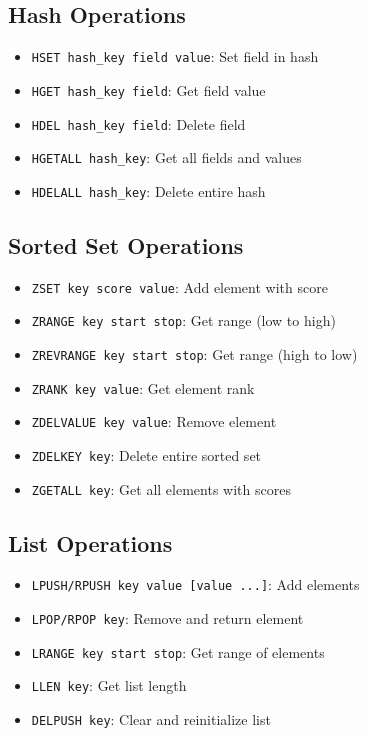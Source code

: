 \documentclass[11pt]{article}
\begin{document}
\subsection{Hash Operations}
\begin{itemize}
    \item \texttt{HSET hash\_key field value}: Set field in hash
    \item \texttt{HGET hash\_key field}: Get field value
    \item \texttt{HDEL hash\_key field}: Delete field
    \item \texttt{HGETALL hash\_key}: Get all fields and values
    \item \texttt{HDELALL hash\_key}: Delete entire hash
\end{itemize}

\subsection{Sorted Set Operations}
\begin{itemize}
    \item \texttt{ZSET key score value}: Add element with score
    \item \texttt{ZRANGE key start stop}: Get range (low to high)
    \item \texttt{ZREVRANGE key start stop}: Get range (high to low)
    \item \texttt{ZRANK key value}: Get element rank
    \item \texttt{ZDELVALUE key value}: Remove element
    \item \texttt{ZDELKEY key}: Delete entire sorted set
    \item \texttt{ZGETALL key}: Get all elements with scores
\end{itemize}

\subsection{List Operations}
\begin{itemize}
    \item \texttt{LPUSH/RPUSH key value [value ...]}: Add elements
    \item \texttt{LPOP/RPOP key}: Remove and return element
    \item \texttt{LRANGE key start stop}: Get range of elements
    \item \texttt{LLEN key}: Get list length
    \item \texttt{DELPUSH key}: Clear and reinitialize list
\end{itemize}
\end{document}
